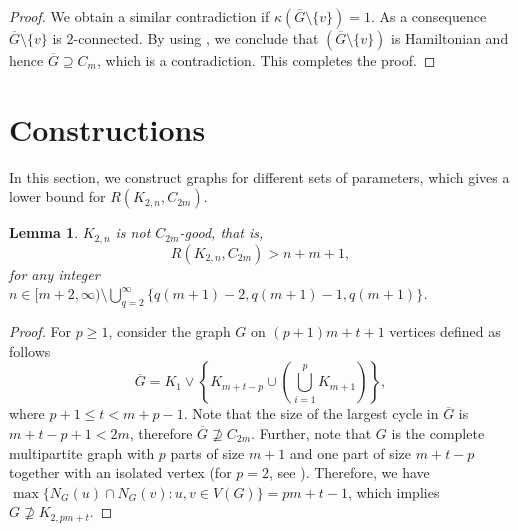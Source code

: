 \documentclass[12pt]{article}
\newtheorem{lemma}[theorem]{Lemma}
\theoremstyle{definition}
\begin{document}
\begin{proof}
    We obtain a similar contradiction if $\kappa(\overline{G}\setminus \{v\})=1$. As a consequence $\overline{G}\setminus \{v\}$ is $2$-connected. By using , we conclude that $(\overline{G}\setminus \{v\})$ is Hamiltonian and hence $\overline{G}\supseteq C_{m}$, which is a contradiction. This completes the proof.
\end{proof}



\section{Constructions}
In this section, we construct graphs for  different sets of parameters, which gives a lower bound for $R(K_{2,n},C_{2m})$.


\begin{lemma}\label{lem:construction1}
    $K_{2,n}$ is not $C_{2m}$-good, that is,
    $$R(K_{2,n},C_{2m})>n+m+1,$$
    for any integer $n\in [m+2, \infty)\setminus\bigcup_{q=2}^{\infty}\{q(m+1)-2,q(m+1)-1,q(m+1)\}$.
\end{lemma}
\begin{proof}
    For $p\geq1$, consider the graph ${G}$ on $(p+1)m+t+1$ vertices defined as follows  
    $$\overline{G}=K_1\vee \left\{K_{m+t-p}\cup\left(\bigcup_{i=1}^pK_{m+1} \right)\right\},$$
    where $p+1\leq t< m+p-1$. Note that the size of the largest cycle in $\overline{G}$ is $m+t-p+1<2m$, therefore $\overline{G}\nsupseteq C_{2m}$. Further, note that $G$ is the complete multipartite graph with $p$ parts of size $m+1$ and one part of size $m+t-p$ together with an isolated vertex (for $p=2$, see ). Therefore, we have  $\max\{N_G(u)\cap N_G(v): u,v\in V(G)\}=pm+t-1$, which implies $G\nsupseteq K_{2,pm+t}$.
\end{proof}
\end{document}
